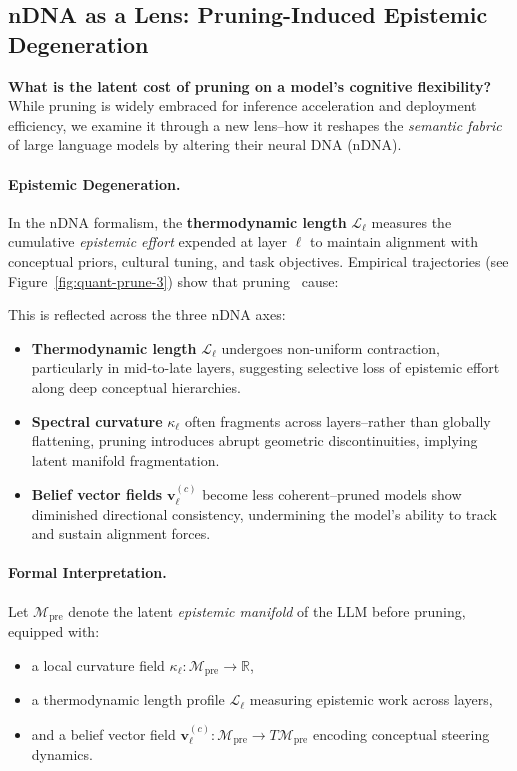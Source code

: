 \subsection{nDNA as a Lens: Pruning-Induced Epistemic Degeneration}

\textbf{What is the latent cost of pruning on a model's cognitive flexibility?} While pruning is widely embraced for inference acceleration and deployment efficiency, we examine it through a new lens--how it reshapes the \emph{semantic fabric} of large language models by altering their neural DNA (nDNA).

\paragraph{Epistemic Degeneration.}
In the nDNA formalism, the \textbf{thermodynamic length} $\mathcal{L}_\ell$ measures the cumulative \emph{epistemic effort} expended at layer $\ell$ to maintain alignment with conceptual priors, cultural tuning, and task objectives. Empirical trajectories (see Figure~\ref{fig:quant-prune-3}) show that  pruning~\citep{han2015deep} cause:

This is reflected across the three nDNA axes:
\begin{itemize}[leftmargin=1.5em]
    \item \textbf{Thermodynamic length} $\mathcal{L}_\ell$ undergoes non-uniform contraction, particularly in mid-to-late layers, suggesting selective loss of epistemic effort along deep conceptual hierarchies.
    \item \textbf{Spectral curvature} $\kappa_\ell$ often fragments across layers--rather than globally flattening, pruning introduces abrupt geometric discontinuities, implying latent manifold fragmentation.
    \item \textbf{Belief vector fields} $\mathbf{v}_\ell^{(c)}$ become less coherent--pruned models show diminished directional consistency, undermining the model's ability to track and sustain alignment forces.
\end{itemize}

\paragraph{Formal Interpretation.}
Let $\mathcal{M}_{\text{pre}}$ denote the latent \textit{epistemic manifold} of the LLM before pruning, equipped with:

\begin{itemize}[leftmargin=1.5em]
    \item a local curvature field $\kappa_\ell: \mathcal{M}_{\text{pre}} \to \mathbb{R}$,
    \item a thermodynamic length profile $\mathcal{L}_\ell$ measuring epistemic work across layers,
    \item and a belief vector field $\mathbf{v}_\ell^{(c)}: \mathcal{M}_{\text{pre}} \to T\mathcal{M}_{\text{pre}}$ encoding conceptual steering dynamics.
\end{itemize}

